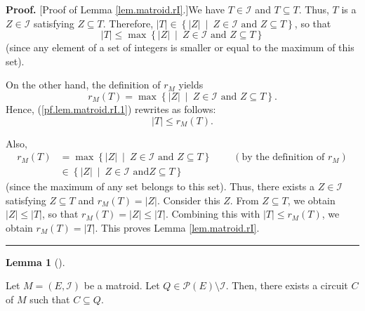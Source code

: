 \documentclass[numbers=enddot,12pt,final,onecolumn,notitlepage]{scrartcl}%
\theoremstyle{definition}
\newtheorem{lem}[theo]{Lemma}
\newenvironment{lemma}[1][]
{\begin{lem}[#1]\begin{leftbar}}
{\end{leftbar}\end{lem}}
\newenvironment{proof}[1][Proof]{\noindent\textbf{#1.} }{\ \rule{0.5em}{0.5em}}
\begin{document}
\begin{proof}
[Proof of Lemma \ref{lem.matroid.rI}.]We have $T\in\mathcal{I}$ and
$T\subseteq T$. Thus, $T$ is a $Z\in\mathcal{I}$ satisfying $Z\subseteq T$.
Therefore, $\left\vert T\right\vert \in\left\{  \left\vert Z\right\vert
\ \mid\ Z\in\mathcal{I}\text{ and }Z\subseteq T\right\}  $, so that%
\begin{equation}
\left\vert T\right\vert \leq\max\left\{  \left\vert Z\right\vert \ \mid
\ Z\in\mathcal{I}\text{ and }Z\subseteq T\right\}  \label{pf.lem.matroid.rI.1}%
\end{equation}
(since any element of a set of integers is smaller or equal to the maximum of
this set).

On the other hand, the definition of $r_{M}$ yields%
\[
r_{M}\left(  T\right)  =\max\left\{  \left\vert Z\right\vert \ \mid
\ Z\in\mathcal{I}\text{ and }Z\subseteq T\right\}  .
\]
Hence, (\ref{pf.lem.matroid.rI.1}) rewrites as follows:%
\[
\left\vert T\right\vert \leq r_{M}\left(  T\right)  .
\]


Also,
\begin{align*}
r_{M}\left(  T\right)   &  =\max\left\{  \left\vert Z\right\vert \ \mid
\ Z\in\mathcal{I}\text{ and }Z\subseteq T\right\}  \ \ \ \ \ \ \ \ \ \ \left(
\text{by the definition of }r_{M}\right) \\
&  \in\left\{  \left\vert Z\right\vert \ \mid\ Z\in\mathcal{I}\text{ and
}Z\subseteq T\right\}
\end{align*}
(since the maximum of any set belongs to this set). Thus, there exists a
$Z\in\mathcal{I}$ satisfying $Z\subseteq T$ and $r_{M}\left(  T\right)
=\left\vert Z\right\vert $. Consider this $Z$. From $Z\subseteq T$, we obtain
$\left\vert Z\right\vert \leq\left\vert T\right\vert $, so that $r_{M}\left(
T\right)  =\left\vert Z\right\vert \leq\left\vert T\right\vert $. Combining
this with $\left\vert T\right\vert \leq r_{M}\left(  T\right)  $, we obtain
$r_{M}\left(  T\right)  =\left\vert T\right\vert $. This proves Lemma
\ref{lem.matroid.rI}.
\end{proof}

\begin{lemma}
\label{lem.matroid.Cin}Let $M=\left(  E,\mathcal{I}\right)  $ be a matroid.
Let $Q\in\mathcal{P}\left(  E\right)  \setminus\mathcal{I}$. Then, there
exists a circuit $C$ of $M$ such that $C\subseteq Q$.
\end{lemma}
\end{document}

